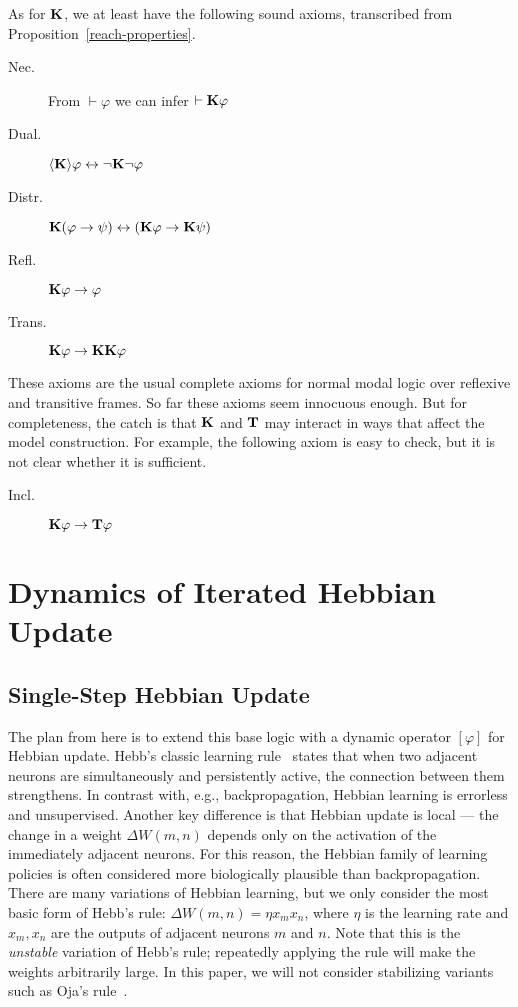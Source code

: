 \documentclass[letterpaper]{article}
\theoremstyle{definition}
\newcommand{\proves}{\vdash}
\newcommand{\Typ}[1]{\textrm{\textup{\textbf{T}}} #1}
\newcommand{\Know}[1]{\textrm{\textup{\textbf{K}}} #1}
\newcommand{\KnowNoArgs}{\textrm{\textup{\textbf{K}}}}
\newcommand{\TypNoArgs}{\textrm{\textup{\textbf{T}}}}
\newcommand{\Hebbop}[1]{[#1]}
\newcommand{\diaKnow}[1]{\langle \textrm{\textup{\textbf{K}}} \rangle #1}
\begin{document}
As for $\KnowNoArgs$, we at least have the following sound axioms, transcribed from Proposition~\ref{reach-properties}.
\begin{description}
    \item[Nec.] From $\proves \varphi$ we can infer $\proves \Know{\varphi}$
    \item[Dual.] $\diaKnow{\varphi} \leftrightarrow \neg \Know{\neg \varphi}$
    \item[Distr.] $\Know{(\varphi \to \psi)} \leftrightarrow (\Know{\varphi} \to \Know{\psi})$
    \item[Refl.] $\Know{\varphi} \to \varphi$
    \item[Trans.] $\Know{\varphi} \to \Know{\Know{\varphi}}$
\end{description}
These axioms are the usual complete axioms for normal modal logic over reflexive and transitive frames.  So far these axioms seem innocuous enough.  But for completeness, the catch is that $\KnowNoArgs$ and $\TypNoArgs$ may interact in ways that affect the model construction.  For example, the following axiom is easy to check, but it is not clear whether it is sufficient.
\begin{description}
    \item[Incl.] $\Know{\varphi} \to \Typ{\varphi}$
\end{description}

\section{Dynamics of Iterated Hebbian Update}

\subsection{Single-Step Hebbian Update}

The plan from here is to extend this base logic with a dynamic operator $\Hebbop{\varphi}$ for Hebbian update.  Hebb's classic learning rule~\cite{hebb-organization-of-behavior-1949} states that when two adjacent neurons are simultaneously and persistently active, the connection between them strengthens.  In contrast with, e.g., backpropagation, Hebbian learning is errorless and unsupervised. Another key difference is that Hebbian update is local --- the change in a weight $\Delta W(m, n)$ depends only on the activation of the immediately adjacent neurons. For this reason, the Hebbian family of learning policies is often considered more biologically plausible than backpropagation. There are many variations of Hebbian learning, but we only consider the most basic form of Hebb's rule: $\Delta W(m, n) = \eta x_m x_n$, where $\eta$ is the learning rate and $x_m, x_n$ are the outputs of adjacent neurons $m$ and $n$.  Note that this is the \emph{unstable} variation of Hebb's rule; repeatedly applying the rule will make the weights arbitrarily large.  In this paper, we will not consider stabilizing variants such as Oja's rule~\cite{oja1982simplified}.
\end{document}

